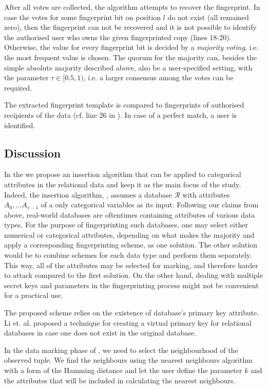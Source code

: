 \documentclass[runningheads]{llncs}
\begin{document}
After all votes are collected, the algorithm attempts to recover the fingerprint.
In case the votes for some fingerprint bit on position $l$ do not exist (all remained zero), then the fingerprint can not be recovered and it is not possible to identify the authorised user who owns the given fingerprinted copy (lines 18-20).
Otherwise, the value for every fingerprint bit is decided by a \textit{majority voting}, i.e. the most frequent value is chosen.
The quorum for the majority can, besides the simple absolute majority described above, also be a user-specified setting, with the parameter $\tau\in[0.5,1)$, i.e. a larger consensus among the votes can be required.

The extracted fingerprint template is compared to fingerprints of authorised recipients of the data (cf. line 26 in ).
In case of a perfect match, a user is identified.

\subsection{Discussion}
In the  we propose an insertion algorithm that can be applied to categorical attributes in the relational data and keep it as the main focus of the study. 
Indeed, the insertion algorithm, , assumes a database $\mathcal{R}$ with attributes $A_0,...A_{v-1}$ of a only categorical variables as its input.
Following our claims from above, real-world databases are oftentimes containing attributes of various data types. 
For the purpose of fingerprinting such databases, one may select either numerical or categorical attributes, depending on what makes the majority and apply a corresponding fingerprinting scheme, as one solution. 
The other solution would be to combine schemes for each data type and perform them separately. This way, all of the attributes may be selected for marking, and therefore harder to attack compared to the first solution. 
On the other hand, dealing with multiple secret keys and parameters in the fingerprinting process might not be convenient for a practical use. 

The proposed scheme relies on the existence of database's primary key attribute. 
Li et. al. \cite{li2005fingerprinting} proposed a technique for creating a virtual primary key for relational databases in case one does not exist in the original database.

In the data marking phase of , we need to select the neighbourhood of the observed tuple. 
We find the neighbours using the nearest neighbours algorithm with a form of the Hamming distance and let the user define the parameter $k$ and the attributes that will be included in calculating the nearest neighbours.
\end{document}

